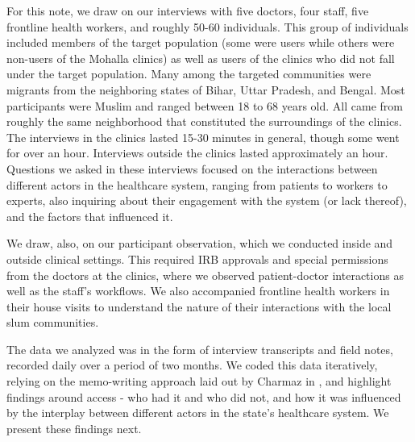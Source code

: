 For this note, we draw on our interviews with five doctors, four staff, five frontline health workers, and roughly 50-60 individuals. This group of individuals included members of the target population (some were users while others were non-users of the Mohalla clinics) as well as users of the clinics who did not fall under the target population. Many among the targeted communities were migrants from the neighboring states of Bihar, Uttar Pradesh, and Bengal. Most participants were Muslim and ranged between 18 to 68 years old. All came from roughly the same neighborhood that constituted the surroundings of the clinics. The interviews in the clinics lasted 15-30 minutes in general, though some went for over an hour. Interviews outside the clinics lasted approximately an hour. Questions we asked in these interviews focused on the interactions between different actors in the healthcare system, ranging from patients to workers to experts, also inquiring about their engagement with the system (or lack thereof), and the factors that influenced it. 

We draw, also, on our participant observation, which we conducted inside and outside clinical settings. This required IRB approvals and special permissions from the doctors at the clinics, where we observed patient-doctor interactions as well as the staff's workflows. We also accompanied frontline health workers in their house visits to understand the nature of their interactions with the local slum communities.

The data we analyzed was in the form of interview transcripts and field notes, recorded daily over a period of two months. We coded this data iteratively, relying on the memo-writing approach laid out by Charmaz in \cite{}, and highlight findings around access - who had it and who did not, and how it was influenced by the interplay between different actors in the state's healthcare system. We present these findings next. %